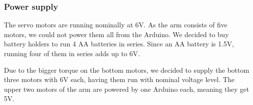 \documentclass[11pt,a4paper, titlepage]{report}
\begin{document}
	\subsubsection{Power supply}
	The servo motors are running nominally at 6V. As the arm consists of five motors, we could not power them all from the Arduino. We decided to buy battery holders to run 4 AA batteries in series. Since an AA battery is 1.5V, running four of them in series adds up to 6V.
	
	Due to the bigger torque on the bottom motors, we decided to supply the bottom three motors with 6V each,  having them run with nominal voltage level. The upper two motors of the arm are powered by one Arduino each, meaning they get 5V.
	
	
	
	
	
	
	
\end{document}
